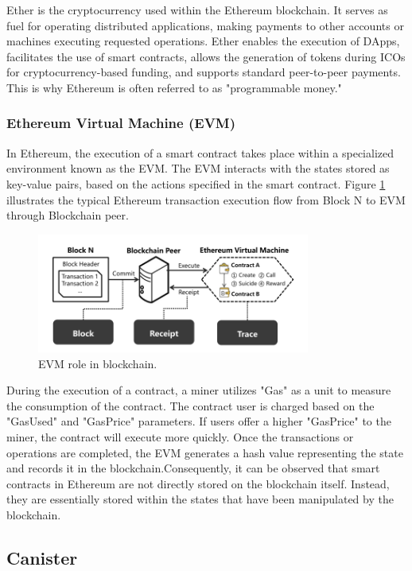 Ether is the cryptocurrency used within the Ethereum blockchain. It serves as fuel for operating distributed applications, making payments to other accounts or machines executing requested operations. Ether enables the execution of \ac{DApps}, facilitates the use of smart contracts, allows the generation of tokens during \ac{ICOs} for cryptocurrency-based funding, and supports standard peer-to-peer payments. This is why Ethereum is often referred to as "programmable money."

\subsubsection{Ethereum Virtual Machine (EVM)}
In Ethereum, the execution of a smart contract takes place within a specialized environment known as the \ac{EVM}. The \ac{EVM} interacts with the states stored as key-value pairs, based on the actions specified in the smart contract. Figure \ref{fig:EVM role} illustrates the
typical Ethereum transaction execution flow from Block N 
to \ac{EVM} through Blockchain peer.
\begin{figure}[H]
 \centering
  \includegraphics[width=0.8\textwidth]{EVM.png}
  \caption{EVM role in blockchain.}
  \label{fig:EVM role}
\end{figure}

During the execution of a contract, a miner utilizes "Gas" as a unit to measure the consumption of the contract. The contract user is charged based on the "GasUsed" and "GasPrice" parameters. If users offer a higher "GasPrice" to the miner, the contract will execute more quickly. Once the transactions or operations are completed, the \ac{EVM} generates a hash value representing the state and records it in the blockchain.Consequently, it can be observed that smart contracts in Ethereum are not directly stored on the blockchain itself. Instead, they are essentially stored within the states that have been manipulated by the blockchain.


\subsection{Canister}


